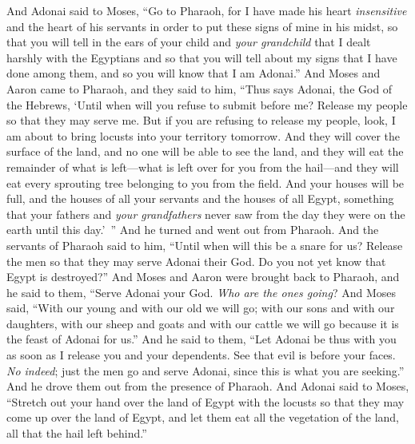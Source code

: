 \begin{biblechapter} %
 And Adonai said to Moses, “Go to Pharaoh, for I have made his heart \textit{insensitive} and the heart of his servants in order to put these signs of mine in his midst,
\verse so that you will tell in the ears of your child and \textit{your grandchild} that I dealt harshly with the Egyptians and so that you will tell about my signs that I have done among them, and so you will know that I am Adonai.”
\verse And Moses and Aaron came to Pharaoh, and they said to him, “Thus says Adonai, the God of the Hebrews, ‘Until when will you refuse to submit before me? Release my people so that they may serve me.
\verse But if you are refusing to release my people, look, I am about to bring locusts into your territory tomorrow.
\verse And they will cover the surface of the land, and no one will be able to see the land, and they will eat the remainder of what is left—what is left over for you from the hail—and they will eat every sprouting tree belonging to you from the field.
\verse And your houses will be full, and the houses of all your servants and the houses of all Egypt, something that your fathers and \textit{your grandfathers} never saw from the day they were on the earth until this day.’ ” And he turned and went out from Pharaoh.
\verse And the servants of Pharaoh said to him, “Until when will this be a snare for us? Release the men so that they may serve Adonai their God. Do you not yet know that Egypt is destroyed?”
\verse And Moses and Aaron were brought back to Pharaoh, and he said to them, “Serve Adonai your God. \textit{Who are the ones going}?
\verse And Moses said, “With our young and with our old we will go; with our sons and with our daughters, with our sheep and goats and with our cattle we will go because it is the feast of Adonai for us.”
\verse And he said to them, “Let Adonai be thus with you as soon as I release you and your dependents. See that evil is before your faces.
\verse \textit{No indeed}; just the men go and serve Adonai, since this is what you are seeking.” And he drove them out from the presence of Pharaoh.
\verse And Adonai said to Moses, “Stretch out your hand over the land of Egypt with the locusts so that they may come up over the land of Egypt, and let them eat all the vegetation of the land, all that the hail left behind.”

\end{biblechapter}
